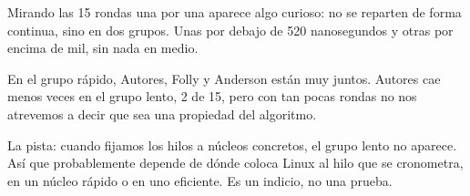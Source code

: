 Mirando las 15 rondas una por una aparece algo curioso: no se reparten de forma continua, sino en dos grupos. Unas por debajo de 520 nanosegundos y otras por encima de mil, sin nada en medio.

En el grupo rápido, Autores, Folly y Anderson están muy juntos. Autores cae menos veces en el grupo lento, 2 de 15, pero con tan pocas rondas no nos atrevemos a decir que sea una propiedad del algoritmo.

La pista: cuando fijamos los hilos a núcleos concretos, el grupo lento no aparece. Así que probablemente depende de dónde coloca Linux al hilo que se cronometra, en un núcleo rápido o en uno eficiente. Es un indicio, no una prueba.
